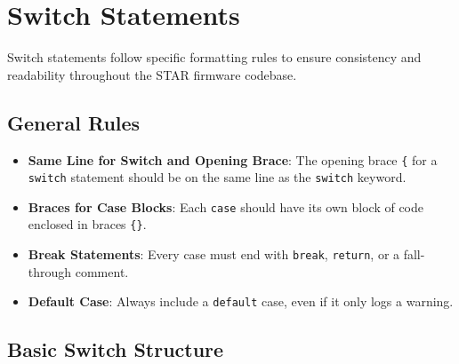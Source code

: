 \section{Switch Statements}

Switch statements follow specific formatting rules to ensure consistency and readability throughout the STAR firmware codebase.

\subsection{General Rules}

\begin{itemize}
    \item \textbf{Same Line for Switch and Opening Brace}: The opening brace \texttt{\{} for a \texttt{switch} statement should be on the same line as the \texttt{switch} keyword.
    \item \textbf{Braces for Case Blocks}: Each \texttt{case} should have its own block of code enclosed in braces \texttt{\{\}}.
    \item \textbf{Break Statements}: Every case must end with \texttt{break}, \texttt{return}, or a fall-through comment.
    \item \textbf{Default Case}: Always include a \texttt{default} case, even if it only logs a warning.
\end{itemize}

\subsection{Basic Switch Structure}

